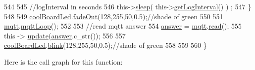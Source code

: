 \begin{DoxyCode}
544 
545         \textcolor{comment}{//logInterval in seconds}
546         this->\hyperlink{class_cool_board_a069952cdcb2e7f68518aa429eceadb6e}{sleep}( this->\hyperlink{class_cool_board_a7508e029f2ee17bb747ffab599285e0d}{getLogInterval}() ) ;
547     \}
548 
549     \hyperlink{class_cool_board_a1b1d3c684a5baa56b08486e192fd8e97}{coolBoardLed}.\hyperlink{class_cool_board_led_a93d545679237e8cc858324367149775c}{fadeOut}(128,255,50,0.5);\textcolor{comment}{//shade of green        }
550 
551     \hyperlink{class_cool_board_a2399f44d7c23c1149a335cb3b46d90f1}{mqtt}.\hyperlink{class_cool_m_q_t_t_aa5eaae967b562b62cbcf2b8d81f6e5d5}{mqttLoop}();
552 
553     \textcolor{comment}{//read mqtt answer}
554     \hyperlink{class_cool_board_a7b835fafd449e5282f7f91d787a2dc15}{answer} = \hyperlink{class_cool_board_a2399f44d7c23c1149a335cb3b46d90f1}{mqtt}.\hyperlink{class_cool_m_q_t_t_ae3c18f6ae9723746d32765f1c8f176ca}{read}();
555     \textcolor{keyword}{this} -> \hyperlink{class_cool_board_a8612756d3f73198cdde857a66f0fe690}{update}(\hyperlink{class_cool_board_a7b835fafd449e5282f7f91d787a2dc15}{answer}.c\_str()); 
556 
557     \hyperlink{class_cool_board_a1b1d3c684a5baa56b08486e192fd8e97}{coolBoardLed}.\hyperlink{class_cool_board_led_a96e1ea13003eee34c9dbcef340404426}{blink}(128,255,50,0.5);\textcolor{comment}{//shade of green    }
558 
559 
560 \}
\end{DoxyCode}
Here is the call graph for this function\+:\nopagebreak
